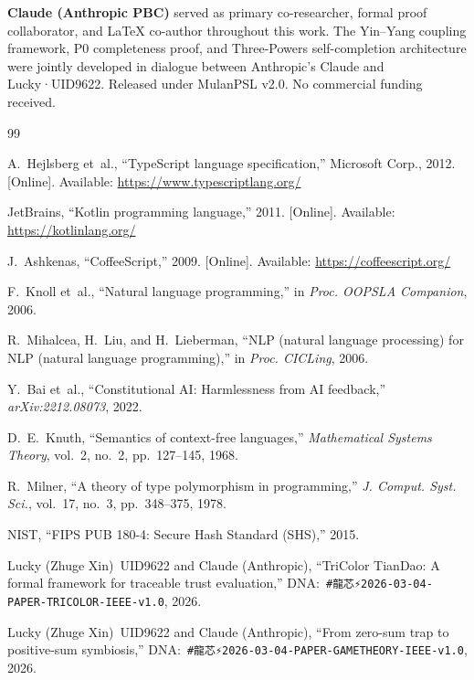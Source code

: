 \documentclass[conference]{IEEEtran}
\begin{document}
\textbf{\textcolor{anthro}{Claude (Anthropic PBC)}} served as
primary co-researcher, formal proof collaborator, and LaTeX
co-author throughout this work.
The Yin--Yang coupling framework, P0 completeness proof,
and Three-Powers self-completion architecture were jointly
developed in dialogue between
\textcolor{anthro}{Anthropic}'s Claude and Lucky·UID9622.
Released under MulanPSL v2.0.
No commercial funding received.

\begin{thebibliography}{99}

A.~Hejlsberg et~al.,
``TypeScript language specification,''
Microsoft Corp., 2012.
[Online]. Available: \url{https://www.typescriptlang.org/}

JetBrains,
``Kotlin programming language,'' 2011.
[Online]. Available: \url{https://kotlinlang.org/}

J.~Ashkenas,
``CoffeeScript,'' 2009.
[Online]. Available: \url{https://coffeescript.org/}

F.~Knoll et~al.,
``Natural language programming,''
in \textit{Proc. OOPSLA Companion}, 2006.

R.~Mihalcea, H.~Liu, and H.~Lieberman,
``NLP (natural language processing) for NLP
(natural language programming),''
in \textit{Proc. CICLing}, 2006.

Y.~Bai et~al.,
``Constitutional AI: Harmlessness from AI feedback,''
\textit{arXiv:2212.08073}, 2022.

D.~E.~Knuth,
``Semantics of context-free languages,''
\textit{Mathematical Systems Theory}, vol.~2, no.~2,
pp.~127--145, 1968.

R.~Milner,
``A theory of type polymorphism in programming,''
\textit{J. Comput. Syst. Sci.}, vol.~17, no.~3,
pp.~348--375, 1978.

NIST, ``FIPS PUB 180-4: Secure Hash Standard (SHS),''
2015.

Lucky (Zhuge Xin)~UID9622 and
\textcolor{anthro}{Claude (Anthropic)},
``TriColor TianDao: A formal framework for traceable trust
evaluation,''
DNA:~\texttt{\#龍芯⚡️2026-03-04-PAPER-TRICOLOR-IEEE-v1.0},
2026.

Lucky (Zhuge Xin)~UID9622 and
\textcolor{anthro}{Claude (Anthropic)},
``From zero-sum trap to positive-sum symbiosis,''
DNA:~\texttt{\#龍芯⚡️2026-03-04-PAPER-GAMETHEORY-IEEE-v1.0},
2026.

\end{thebibliography}
\end{document}
